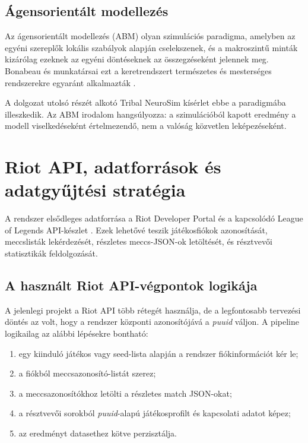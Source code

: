 \section{Ágensorientált modellezés}

Az ágensorientált modellezés (ABM) olyan szimulációs paradigma, amelyben az egyéni szereplők lokális szabályok alapján cselekszenek, és a makroszintű minták kizárólag ezeknek az egyéni döntéseknek az összegzéseként jelennek meg. Bonabeau és munkatársai ezt a keretrendszert természetes és mesterséges rendszerekre egyaránt alkalmazták \cite{bonabeau2002}.

A dolgozat utolsó részét alkotó Tribal NeuroSim kísérlet ebbe a paradigmába illeszkedik. Az ABM irodalom hangsúlyozza: a szimulációból kapott eredmény a modell viselkedéseként értelmezendő, nem a valóság közvetlen leképezéseként.

\chapter{Riot API, adatforrások és adatgyűjtési stratégia}

A rendszer elsődleges adatforrása a Riot Developer Portal és a kapcsolódó League of Legends API-készlet \cite{riotportal,riotapi}. Ezek lehetővé teszik játékosfiókok azonosítását, meccslisták lekérdezését, részletes meccs-JSON-ok letöltését, és résztvevői statisztikák feldolgozását.

\section{A használt Riot API-végpontok logikája}

A jelenlegi projekt a Riot API több rétegét használja, de a legfontosabb tervezési döntés az volt, hogy a rendszer központi azonosítójává a \textit{puuid} váljon. A pipeline logikailag az alábbi lépésekre bontható:

\begin{enumerate}
    \item egy kiinduló játékos vagy seed-lista alapján a rendszer fiókinformációt kér le;
    \item a fiókból meccsazonosító-listát szerez;
    \item a meccsazonosítókhoz letölti a részletes match JSON-okat;
    \item a résztvevői sorokból \textit{puuid}-alapú játékosprofilt és kapcsolati adatot képez;
    \item az eredményt datasethez kötve perzisztálja.
\end{enumerate}

